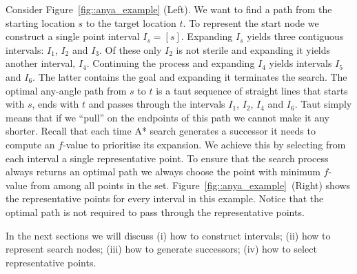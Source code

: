 \begin{example}
\label{ex::anya_example}
Consider Figure~\ref{fig::anya_example} (Left). 
We want to find a path from the starting location $s$ to the target location $t$.
To represent the start node we construct a single point interval $I_s = [s]$. 
Expanding $I_s$ yields three contiguous intervals: $I_1$, $I_2$ and $I_3$.
Of these only $I_2$ is not sterile and expanding it yields another interval, $I_4$.
Continuing the process and expanding $I_4$ yields intervals $I_5$ and $I_6$.
The latter contains the goal and expanding it terminates the search.
The optimal any-angle path from $s$ to $t$ is a taut sequence of 
straight lines that starts with $s$, ends with $t$ and passes through the intervals
$I_1$, $I_2$, $I_4$ and $I_6$. Taut simply means that if we ``pull'' on the endpoints
of this path we cannot make it any shorter.
Recall that each time A* search generates a successor it needs to compute an $f$-value
to prioritise its expansion. We achieve this by selecting from each interval a 
single representative point. To ensure that the search process always returns
an optimal path we always choose the point with minimum $f$-value 
from among all points in the set. 
Figure~\ref{fig::anya_example}~(Right) shows the representative points
for every interval in this example.
Notice that the optimal path is not required to pass through the representative points.

\end{example} 

In the next sections we will discuss (i) how to construct intervals;
(ii) how to represent search nodes; (iii) how to generate successors; 
(iv) how to select representative points.

